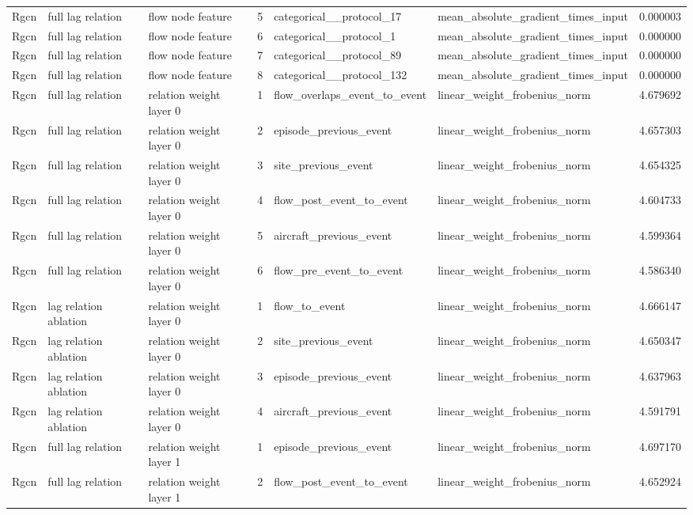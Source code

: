 \begin{table}
\begin{tabular}{lllrlll}
Rgcn & full lag relation & flow node feature & 5 & categorical\_\_protocol\_17 & mean\_absolute\_gradient\_times\_input & 0.000003 \\
Rgcn & full lag relation & flow node feature & 6 & categorical\_\_protocol\_1 & mean\_absolute\_gradient\_times\_input & 0.000000 \\
Rgcn & full lag relation & flow node feature & 7 & categorical\_\_protocol\_89 & mean\_absolute\_gradient\_times\_input & 0.000000 \\
Rgcn & full lag relation & flow node feature & 8 & categorical\_\_protocol\_132 & mean\_absolute\_gradient\_times\_input & 0.000000 \\
Rgcn & full lag relation & relation weight layer 0 & 1 & flow\_overlaps\_event\_to\_event & linear\_weight\_frobenius\_norm & 4.679692 \\
Rgcn & full lag relation & relation weight layer 0 & 2 & episode\_previous\_event & linear\_weight\_frobenius\_norm & 4.657303 \\
Rgcn & full lag relation & relation weight layer 0 & 3 & site\_previous\_event & linear\_weight\_frobenius\_norm & 4.654325 \\
Rgcn & full lag relation & relation weight layer 0 & 4 & flow\_post\_event\_to\_event & linear\_weight\_frobenius\_norm & 4.604733 \\
Rgcn & full lag relation & relation weight layer 0 & 5 & aircraft\_previous\_event & linear\_weight\_frobenius\_norm & 4.599364 \\
Rgcn & full lag relation & relation weight layer 0 & 6 & flow\_pre\_event\_to\_event & linear\_weight\_frobenius\_norm & 4.586340 \\
Rgcn & lag relation ablation & relation weight layer 0 & 1 & flow\_to\_event & linear\_weight\_frobenius\_norm & 4.666147 \\
Rgcn & lag relation ablation & relation weight layer 0 & 2 & site\_previous\_event & linear\_weight\_frobenius\_norm & 4.650347 \\
Rgcn & lag relation ablation & relation weight layer 0 & 3 & episode\_previous\_event & linear\_weight\_frobenius\_norm & 4.637963 \\
Rgcn & lag relation ablation & relation weight layer 0 & 4 & aircraft\_previous\_event & linear\_weight\_frobenius\_norm & 4.591791 \\
Rgcn & full lag relation & relation weight layer 1 & 1 & episode\_previous\_event & linear\_weight\_frobenius\_norm & 4.697170 \\
Rgcn & full lag relation & relation weight layer 1 & 2 & flow\_post\_event\_to\_event & linear\_weight\_frobenius\_norm & 4.652924 \\

\end{tabular}
\end{table}
